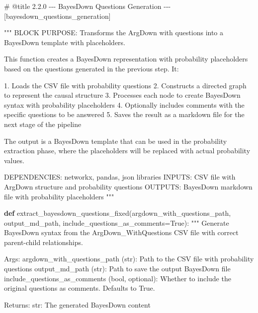 \documentclass[
  11pt,
  letterpaper,
]{book}
\newenvironment{Shaded}{\begin{snugshade}}{\end{snugshade}}
\newcommand{\CommentTok}[1]{\textcolor[rgb]{0.37,0.37,0.37}{#1}}
\newcommand{\KeywordTok}[1]{\textcolor[rgb]{0.00,0.23,0.31}{\textbf{#1}}}
\newcommand{\NormalTok}[1]{\textcolor[rgb]{0.00,0.23,0.31}{#1}}
\newcommand{\OperatorTok}[1]{\textcolor[rgb]{0.37,0.37,0.37}{#1}}
\newcommand{\VariableTok}[1]{\textcolor[rgb]{0.07,0.07,0.07}{#1}}
\begin{document}
\label{bayesdown_questions_generation}
\begin{Shaded}
\begin{Highlighting}[]
\CommentTok{\# @title 2.2.0 {-}{-}{-} BayesDown Questions Generation {-}{-}{-} [bayesdown\_questions\_generation]}

\CommentTok{"""}
\CommentTok{BLOCK PURPOSE: Transforms the ArgDown with questions into a BayesDown template with placeholders.}

\CommentTok{This function creates a BayesDown representation with probability placeholders}
\CommentTok{based on the questions generated in the previous step. It:}

\CommentTok{1. Loads the CSV file with probability questions}
\CommentTok{2. Constructs a directed graph to represent the causal structure}
\CommentTok{3. Processes each node to create BayesDown syntax with probability placeholders}
\CommentTok{4. Optionally includes comments with the specific questions to be answered}
\CommentTok{5. Saves the result as a markdown file for the next stage of the pipeline}

\CommentTok{The output is a BayesDown template that can be used in the probability}
\CommentTok{extraction phase, where the placeholders will be replaced with actual}
\CommentTok{probability values.}

\CommentTok{DEPENDENCIES: networkx, pandas, json libraries}
\CommentTok{INPUTS: CSV file with ArgDown structure and probability questions}
\CommentTok{OUTPUTS: BayesDown markdown file with probability placeholders}
\CommentTok{"""}

\KeywordTok{def}\NormalTok{ extract\_bayesdown\_questions\_fixed(argdown\_with\_questions\_path, output\_md\_path, include\_questions\_as\_comments}\OperatorTok{=}\VariableTok{True}\NormalTok{):}
  \CommentTok{"""}
\CommentTok{  Generate BayesDown syntax from the ArgDown\_WithQuestions CSV file with}
\CommentTok{  correct parent{-}child relationships.}

\CommentTok{  Args:}
\CommentTok{      argdown\_with\_questions\_path (str): Path to the CSV file with probability questions}
\CommentTok{      output\_md\_path (str): Path to save the output BayesDown file}
\CommentTok{      include\_questions\_as\_comments (bool, optional): Whether to include the original}
\CommentTok{                                                    questions as comments. Defaults to True.}

\CommentTok{  Returns:}
\CommentTok{      str: The generated BayesDown content}


\end{Highlighting}
\end{Shaded}
\end{document}
